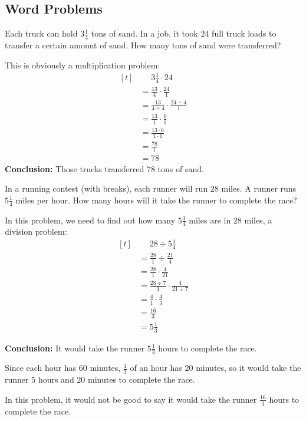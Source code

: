 \subsection{Word Problems}

\begin{myexample}
Each truck can hold $3\frac{1}{4}$ tons of sand. In a job, it took $24$ full truck loads to transfer a certain amount of sand. How many tons of sand were transferred?
\end{myexample}
\begin{solution}
This is obviously a multiplication problem:
\[ 
\begin{aligned}[t]
	&\phantom{{}=} 3\frac{1}{4} \cdot 24 \\
	&= \frac{13}{4} \cdot \frac{24}{1} \\
	&= \frac{13}{4\div4} \cdot \frac{24\div4}{1} \\
	&= \frac{13}{1} \cdot \frac{6}{1} \\
	&= \frac{13\cdot6}{1\cdot1} \\
	&= \frac{78}{1} \\
	&= 78
\end{aligned}
\]
\textbf{Conclusion:} Those trucks transferred $78$ tons of sand.
\end{solution}


\begin{myexample}
In a running contest (with breaks), each runner will run $28$ miles. A runner runs $5\frac{1}{4}$ miles per hour. How many hours will it take the runner to complete the race?
\end{myexample}
\begin{solution}
In this problem, we need to find out how many $5\frac{1}{4}$ miles are in $28$ miles, a division problem:
\[ 
\begin{aligned}[t]
	&\phantom{{}=} 28 \div 5\frac{1}{4} \\
	&= \frac{28}{1} \div \frac{21}{4} \\
	&= \frac{28}{1} \cdot \frac{4}{21} \\
	&= \frac{28\div7}{1} \cdot \frac{4}{21\div7} \\
	&= \frac{4}{1} \cdot \frac{4}{3} \\
	&= \frac{16}{3} \\
	&= 5\frac{1}{3}
\end{aligned}
\]

\textbf{Conclusion:} It would take the runner $5\frac{1}{3}$ hours to complete the race. 

Since each hour has $60$ minutes, $\frac{1}{3}$ of an hour has $20$ minutes, so it would take the runner $5$ hours and $20$ minutes to complete the race.

In this problem, it would not be good to say it would take the runner $\frac{16}{3}$ hours to complete the race.
\end{solution}

